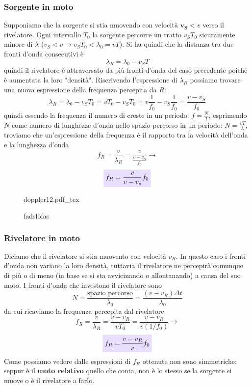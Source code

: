 \documentclass[x11names]{article}
\newcommand{\incfig}[1]{%
	\def\svgwidth{\columnwidth}
	{#1.pdf_tex}
}
\newcommand{\viola}[1]{\colorbox{yred}{$\displaystyle #1$}}
\begin{document}
	\subsubsection{Sorgente in moto}
	Supponiamo che la sorgente si stia muovendo con velocità \(\boldsymbol{v_S} < v\) verso il rivelatore. Ogni intervallo \(T_0\) la sorgente percorre un tratto \(v_ST_0\) sicuramente minore di \(\lambda\) (\(v_S < v \to v_ST_0 < \lambda_0= vT\)). Si ha quindi che la distanza tra due fronti d'onda consecutivi è
	\[ 
	\lambda_R = \lambda_0 - v_ST
	\]
	quindi il rivelatore è attraversato da più fronti d'onda del caso precedente poiché è aumentata la loro "densità". Riscrivendo l'espressione di \(\lambda_R\) possiamo trovare una nuova espressione della frequenza percepita da \(R\): 
	\[ 
	\lambda_R = \lambda_0 - v_ST_0 = vT_0 - v_ST_0 = v\frac{1}{f_0} - v_S\frac{1}{f_0} = \frac{v - v_S}{f_0}
	\]
	quindi essendo la frequenza il numero di creste in un periodo: \(f =\frac{N}{T}\), esprimendo \(N\) come numero di lunghezze d'onda nello spazio percorso in un periodo: \(N = \frac{vT}{\lambda}\), troviamo che un'espressione della frequenza è il rapporto tra la velocità dell'onda e la lunghezza d'onda 
	\[ 
	f_R = \frac{v}{\lambda_R} = \frac{v}{\frac{v - v_S}{f_0}} \to
	\]
	\begin{equation}
		\viola{f_R = \frac{v}{v - v_s}f_0}
	\end{equation}
	
	\begin{figure}[ht]
		\centering
		\incfig{doppler12}
		\caption{fadslòfas}
		\label{fig:fasdkllfas}
	\end{figure}
	
	\subsubsection{Rivelatore in moto}
	Diciamo che il rivelatore si stia muovento con velocità \(v_R\). In questo caso i fronti d'onda non variano la loro densità, tuttavia il rivelatore ne percepirà comunque di più o di meno (in base se si sta avvicinando o allontanando) a causa del suo moto. I fronti d'onda che investono il rivelatore sono
	\[ 
	N = \frac{\text{spazio percorso}}{\lambda_0} = \frac{(v - v_R)\Delta t}{\lambda_0}
	\]
	da cui ricaviamo la frequenza percepita dal rivelatore
	\[ 
	f_R = \frac{v}{\lambda_R} = \frac{v - v_R}{vT_0} = \frac{v - v_R}{v(1/f_0)} \to
	\]
	\begin{equation}
	\viola{f_R = \frac{v - v_R}{v}f_0}
	\end{equation}
	Come possiamo vedere dalle espressioni di \(f_R\) ottenute non sono simmetriche: seppur è il \textbf{moto relativo} quello che conta, non è lo stesso se la sorgente si muove o è il rivelatore a farlo.
	
\end{document}
